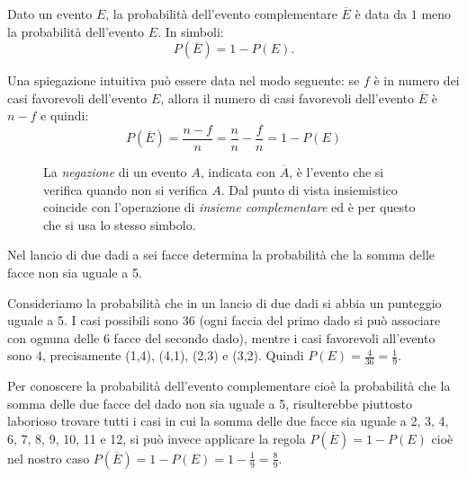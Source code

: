 \begin{teorema}
Dato un evento $E$, la probabilità dell'evento complementare $\overline E$ è 
data da $1$ meno la probabilità dell'evento $E$. In simboli: \[ P(\overline 
E)=1-P(E). \]
\end{teorema}
Una spiegazione intuitiva può essere data nel modo seguente:
se $f$ è in numero dei casi favorevoli dell'evento $E$, allora il numero di 
casi favorevoli dell'evento $\overline 
E$ è $n-f$ e quindi:
$$ P(\overline 
E)= \dfrac{n-f}{n}=\dfrac{n}{n}-\dfrac{f}{n}=1-P(E)$$

\begin{inaccessibleblock}
 \begin{figure}[htpb]
\begin{minipage}[c]{.35\textwidth}
\end{minipage}\hfil
\begin{minipage}[c]{.55\textwidth}
La \emph{negazione} di un evento $A$, indicata con $\overline A$, è 
l'evento che si verifica quando non si verifica $A$. Dal punto di vista 
insiemistico coincide con l'operazione di \emph{insieme complementare} ed è per 
questo che si usa lo stesso simbolo.
\end{minipage}
\end{figure}
\end{inaccessibleblock}

\begin{exrig}
\begin{esempio}
Nel lancio di due dadi a sei facce determina la probabilità che la somma delle 
facce non sia uguale a 5.

Consideriamo la probabilità che in un lancio di due dadi si abbia un punteggio 
uguale a 5. I casi possibili sono 36 (ogni faccia del primo dado si può 
associare con ognuna delle 6 facce del secondo dado), mentre i casi favorevoli 
all'evento sono 4, precisamente (1,4), (4,1), (2,3) e (3,2). Quindi $P(E)=\frac 
4{36}=\frac 1 9$.

Per conoscere la probabilità dell'evento complementare cioè la probabilità che 
la somma delle due facce del dado non sia uguale a 5, risulterebbe piuttosto 
laborioso trovare tutti i casi in cui la somma delle due facce sia uguale a 2, 
3, 4, 6, 7, 8, 9, 10, 11 e 12, si può invece applicare la regola $P(\overline 
E)=1-P(E)$ cioè nel nostro caso $P(\overline E)=1-P(E)=1-\frac 1 9=\frac 8 9$.
\end{esempio}
\end{exrig}



